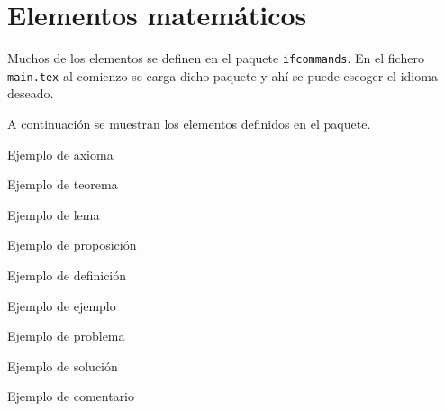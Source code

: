 \section{Elementos matemáticos}

Muchos de los elementos se definen en el paquete \texttt{ifcommands}. En el fichero \texttt{main.tex} al comienzo se carga dicho paquete y ahí se puede escoger el idioma deseado.

A continuación se muestran los elementos definidos en el paquete.

\begin{ifaxiom}
	Ejemplo de axioma
\end{ifaxiom}

\begin{iftheorem}
	Ejemplo de teorema
\end{iftheorem}

\begin{iflemma}
	Ejemplo de lema
\end{iflemma}

\begin{ifproposition}
	Ejemplo de proposición
\end{ifproposition}

\begin{ifdefinition}
	Ejemplo de definición
\end{ifdefinition}

\begin{ifexample}
	Ejemplo de ejemplo
\end{ifexample}

\begin{ifproblem}
	Ejemplo de problema
\end{ifproblem}

\begin{ifsolution}
	Ejemplo de solución
\end{ifsolution}

\begin{ifremark}
	Ejemplo de comentario
\end{ifremark}

